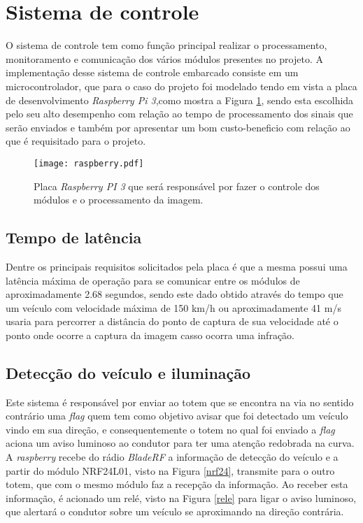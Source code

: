         
\section{Sistema de controle}
    O sistema de controle tem como função principal realizar o processamento, monitoramento e comunicação dos vários módulos presentes no projeto. A implementação desse sistema de controle embarcado consiste em um microcontrolador, que para o caso do projeto foi modelado tendo em vista a placa de desenvolvimento \emph{Raspberry Pi 3},como mostra a Figura \ref{raspberry}, sendo esta escolhida pelo seu alto desempenho com relação ao tempo de processamento dos sinais que serão enviados e também por apresentar um bom custo-beneficio com relação ao que é requisitado para o projeto. 
    
    \begin{figure}[H]
    \centering
   \texttt{[image: raspberry.pdf]}
   \caption{Placa \emph{Raspberry PI 3} que será responsável por fazer o controle dos módulos e o processamento da imagem.}
   \label{raspberry}
    \end{figure}
    
    
    \subsection{Tempo de latência}
    Dentre os principais requisitos solicitados pela placa é que a mesma possui uma latência máxima de operação para se comunicar entre os módulos de aproximadamente 2.68 segundos, sendo este dado obtido através do tempo que um veículo com velocidade máxima de 150 km/h ou aproximadamente 41 m/s usaria para percorrer a distância do ponto de captura de sua velocidade até o ponto onde ocorre a captura da imagem casso ocorra uma infração. 
    
    \subsection{Detecção do veículo e iluminação}
    Este sistema é responsável por enviar ao totem que se encontra na via no sentido contrário uma \emph{flag} quem tem como objetivo avisar que foi detectado um veículo vindo em sua direção, e consequentemente o totem no qual foi enviado a \emph{flag} aciona um aviso luminoso ao condutor para ter uma atenção redobrada na curva. A \emph{raspberry} recebe do rádio \emph{BladeRF} a informação de detecção do veículo e a partir do módulo NRF24L01, visto na Figura \ref{nrf24}, transmite para o outro totem, que com o mesmo módulo faz a recepção da informação. Ao receber esta informação, é acionado um relé, visto na Figura \ref{rele} para ligar o aviso luminoso, que alertará o condutor sobre um veículo se aproximando na direção contrária.
    
